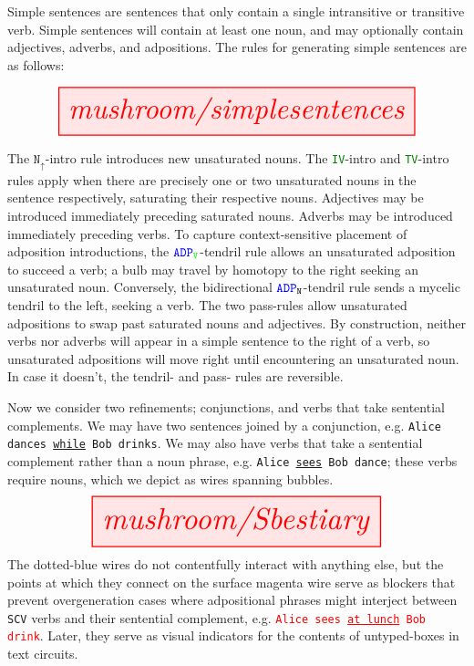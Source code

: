 \begin{myboxB}
\begin{rules}\label{rules:simp}
Simple sentences are sentences that only contain a single intransitive or transitive verb. Simple sentences will contain at least one noun, and may optionally contain adjectives, adverbs, and adpositions. The rules for generating simple sentences are as follows:

\[
\resizebox{0.9\textwidth}{!}{\tikzfig{mushroom/simplesentences}}
\]

The $\texttt{N}_\uparrow$-intro rule introduces new unsaturated nouns. The \textcolor{green}{\texttt{IV}}-intro and \textcolor{green}{\texttt{TV}}-intro rules apply when there are precisely one or two unsaturated nouns in the sentence respectively, saturating their respective nouns. Adjectives may be introduced immediately preceding saturated nouns. Adverbs may be introduced immediately preceding verbs. To capture context-sensitive placement of adposition introductions, the $\textcolor{blue}{\texttt{ADP}}_{\textcolor{green}{\texttt{V}}}$-tendril rule allows an unsaturated adposition to succeed a verb; a bulb may travel by homotopy to the right seeking an unsaturated noun. Conversely, the bidirectional $\textcolor{blue}{\texttt{ADP}}_{\texttt{N}}$-tendril rule sends a mycelic tendril to the left, seeking a verb. The two pass-rules allow unsaturated adpositions to swap past saturated nouns and adjectives. By construction, neither verbs nor adverbs will appear in a simple sentence to the right of a verb, so unsaturated adpositions will move right until encountering an unsaturated noun. In case it doesn't, the tendril- and pass- rules are reversible.
\end{rules}
\end{myboxB}
\clearpage

\begin{myboxB}
\begin{rules}\label{rules:comp}
Now we consider two refinements; conjunctions, and verbs that take sentential complements. We may have two sentences joined by a conjunction, e.g. \texttt{Alice dances \underline{while} Bob drinks}. We may also have verbs that take a sentential complement rather than a noun phrase, e.g. \texttt{Alice \underline{sees} Bob dance}; these verbs require nouns, which we depict as wires spanning bubbles.
\[
\resizebox{0.75\textwidth}{!}{\tikzfig{mushroom/Sbestiary}}
\]
The dotted-blue wires do not contentfully interact with anything else, but the points at which they connect on the surface magenta wire serve as blockers that prevent overgeneration cases where adpositional phrases might interject between \texttt{SCV} verbs and their sentential complement, e.g. \textcolor{red}{\texttt{Alice sees \underline{at lunch} Bob drink}}. Later, they serve as visual indicators for the contents of untyped-boxes in text circuits.
\end{rules}
\end{myboxB}
\clearpage

